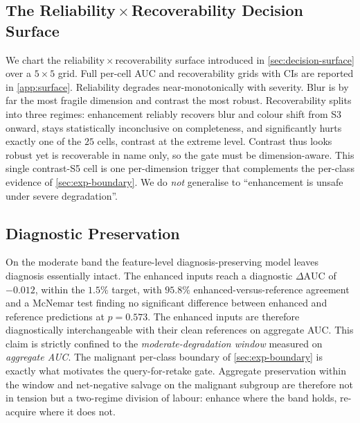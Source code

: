 \subsection{The Reliability\,$\times$\,Recoverability Decision Surface}
\label{sec:exp-surface}
We chart the reliability\,$\times$\,recoverability surface introduced in
\cref{sec:decision-surface} over a $5\times5$ grid. Full per-cell AUC and recoverability
grids with CIs are reported in \cref{app:surface}.
Reliability degrades near-monotonically with severity. Blur is by far the most fragile
dimension and contrast the most robust. Recoverability splits into three regimes:
enhancement reliably recovers blur and colour shift from S3 onward, stays statistically
inconclusive on completeness, and significantly hurts exactly one of the $25$ cells,
contrast at the extreme level. Contrast thus looks robust yet is recoverable in name only,
so the gate must be dimension-aware. This single contrast-S5 cell is one per-dimension
trigger that complements the per-class evidence of \cref{sec:exp-boundary}. We do
\emph{not} generalise to ``enhancement is unsafe under severe degradation''.

\subsection{Diagnostic Preservation}\label{sec:exp-preserve}
On the moderate band the feature-level diagnosis-preserving model leaves diagnosis
essentially intact. The enhanced inputs reach a diagnostic $\Delta\mathrm{AUC}$ of
$-0.012$, within the $1.5\%$ target, with $95.8\%$ enhanced-versus-reference agreement and
a McNemar test finding no significant difference between enhanced and reference predictions
at $p=0.573$. The enhanced inputs are therefore diagnostically interchangeable with their
clean references on aggregate AUC. This claim is strictly confined to the
\emph{moderate-degradation window} measured on \emph{aggregate AUC}. The malignant
per-class boundary of \cref{sec:exp-boundary} is exactly what motivates the
query-for-retake gate. Aggregate preservation within the window and net-negative salvage on
the malignant subgroup are therefore not in tension but a two-regime division of labour:
enhance where the band holds, re-acquire where it does not.

